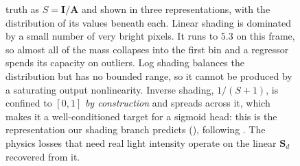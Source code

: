\begin{figure}[t!]
{    truth as $S = \mathbf{I} / \mathbf{A}$ and shown in three representations, with the
    distribution of its values beneath each.
    Linear shading is dominated by a small number of very bright pixels. It runs to
    $5.3$ on this frame, so almost all of the mass collapses into the first bin and a
    regressor spends its capacity on outliers.
    Log shading balances the distribution but has no bounded range, so it cannot be produced
    by a saturating output nonlinearity.
    Inverse shading, $1/(S+1)$, is confined to $[0,1]$ \emph{by construction} and spreads
    across it, which makes it a well-conditioned target for a sigmoid head: this is the
    representation our shading branch predicts (), following
    . The physics losses that need real light intensity operate
    on the linear $\mathbf{S}_d$ recovered from it.
  }
  \label{fig:inverse_shading}
\end{figure}
